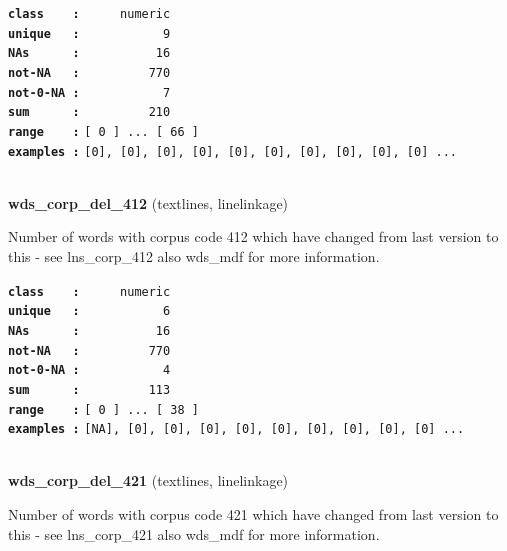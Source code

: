\documentclass[]{article}
\begin{document}
\textbf{\texttt{class\ \ \ \ :}} \texttt{~~~~~numeric}\\
\textbf{\texttt{unique\ \ \ :}} \texttt{~~~~~~~~~~~9}\\
\textbf{\texttt{NAs\ \ \ \ \ \ :}} \texttt{~~~~~~~~~~16}\\
\textbf{\texttt{not-NA\ \ \ :}} \texttt{~~~~~~~~~770}\\
\textbf{\texttt{not-0-NA\ :}} \texttt{~~~~~~~~~~~7}\\
\textbf{\texttt{sum\ \ \ \ \ \ :}} \texttt{~~~~~~~~~210}\\
\textbf{\texttt{range\ \ \ \ :}}
\texttt{{[}\ 0\ {]}\ ...\ {[}\ 66\ {]}}\\
\textbf{\texttt{examples\ :}}
\texttt{{[}0{]},\ {[}0{]},\ {[}0{]},\ {[}0{]},\ {[}0{]},\ {[}0{]},\ {[}0{]},\ {[}0{]},\ {[}0{]},\ {[}0{]}\ ...}\\

~

\textbf{wds\_corp\_del\_412} (textlines, linelinkage)

Number of words with corpus code 412 which have changed from last
version to this - see lns\_corp\_412 also wds\_mdf for more information.

\textbf{\texttt{class\ \ \ \ :}} \texttt{~~~~~numeric}\\
\textbf{\texttt{unique\ \ \ :}} \texttt{~~~~~~~~~~~6}\\
\textbf{\texttt{NAs\ \ \ \ \ \ :}} \texttt{~~~~~~~~~~16}\\
\textbf{\texttt{not-NA\ \ \ :}} \texttt{~~~~~~~~~770}\\
\textbf{\texttt{not-0-NA\ :}} \texttt{~~~~~~~~~~~4}\\
\textbf{\texttt{sum\ \ \ \ \ \ :}} \texttt{~~~~~~~~~113}\\
\textbf{\texttt{range\ \ \ \ :}}
\texttt{{[}\ 0\ {]}\ ...\ {[}\ 38\ {]}}\\
\textbf{\texttt{examples\ :}}
\texttt{{[}NA{]},\ {[}0{]},\ {[}0{]},\ {[}0{]},\ {[}0{]},\ {[}0{]},\ {[}0{]},\ {[}0{]},\ {[}0{]},\ {[}0{]}\ ...}\\

~

\textbf{wds\_corp\_del\_421} (textlines, linelinkage)

Number of words with corpus code 421 which have changed from last
version to this - see lns\_corp\_421 also wds\_mdf for more information.
\end{document}
